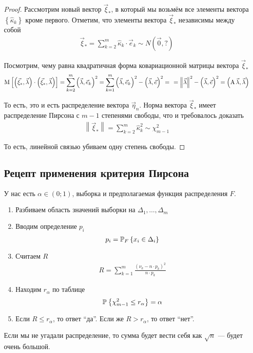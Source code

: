 \begin{proof}
  Рассмотрим новый вектор $\vec{\xi}_*$, в который мы возьмём все элементы
  вектора $\left\{ \hat{\kappa}_k \right\}$ кроме первого. Отметим, что
  элементы вектора $\vec{\xi}_*$ независимы между собой
  \begin{align*}
      \vec{\xi}_* = \sum_{k=2}^{m} \hat{\kappa}_k \cdot \vec{e}_k
      \sim N\left( \vec{0}, ? \right)
  \end{align*}

  Посмотрим, чему равна квадратичная форма ковариационной матрицы вектора
  $\vec{\xi}_*$
  \begin{align*}
      \Mean{\left( \vec{\xi}_*, \vec{\lambda} \right) \cdot
      \left( \vec{\xi}_*, \vec{\lambda} \right)}
      = \sum_{k=2}^{m}\left( \vec{\lambda}, \vec{e}_k \right)^2
      = \sum_{k=1}^{m}\left( \vec{\lambda}, \vec{e}_k \right)^2
      - \left( \vec{\lambda}, \vec{e} \right)^2 = \ \
      = \left\| \vec{\lambda} \right\|^2
      - \left( \vec{\lambda}, \vec{e} \right)^2
      = \left( \operatorname{A} \vec{\lambda}, \vec{\lambda} \right)
  \end{align*}

  То есть, это и есть распределение вектора $\vec{\eta}_n$. Норма вектора
  $\vec{\xi}_*$ имеет распределение Пирсона с $m-1$ степенями свободы, что и
  требовалось доказать
  \begin{align*}
      \left\| \vec{\xi}_* \right\| = \sum_{k=2}^{m} \hat{\kappa}_k^2
      \sim \chi_{m-1}^2
  \end{align*}

  То есть, линейной связью убиваем одну степень свободы.
\end{proof}

\subsection{Рецепт применения критерия Пирсона}
У нас есть $\alpha \in \left( 0; 1 \right)$, выборка \xsample и
предполагаемая функция распределения $F$.

\begin{enumerate}
  \item Разбиваем область значений выборки на $\Delta_1, \dots, \Delta_m$
  \item Вводим определение $p_i$
      \begin{align*}
      p_i = \Probability[F]{x_i \in \Delta_i}
      \end{align*}
  \item Считаем $R$
      \begin{align*}
      R = \sum_{k=1}^{m}\frac{\left( \nu_k - n \cdot p_k \right)^2}{
          n \cdot p_k}
      \end{align*}
  \item Находим $r_{\alpha}$ по таблице
      \begin{align*}
      \Probability{\chi_{m-1}^2 \le r_{\alpha}} = \alpha
      \end{align*}
  \item Если $R \le r_{\alpha}$, то ответ ``да''. Если же $R > r_{\alpha}$,
      то ответ ``нет''.
\end{enumerate}

Если мы не угадали распределение, то сумма будет вести себя как $\sqrt{n}$ ---
будет очень большой.
